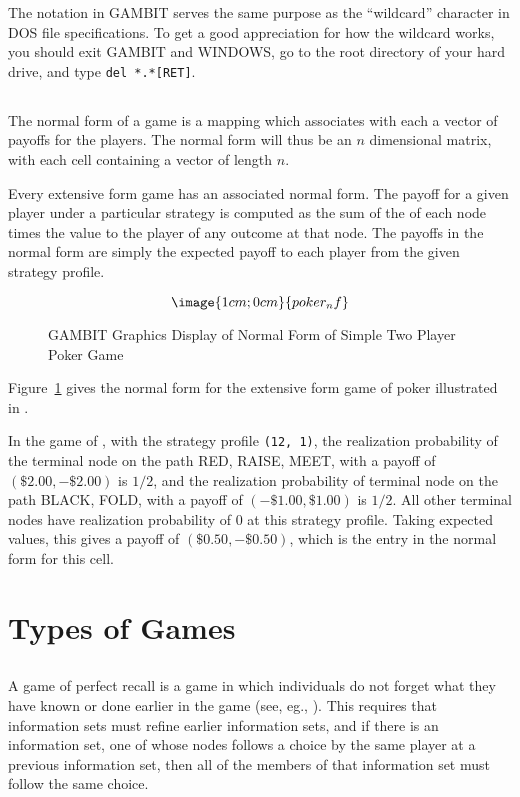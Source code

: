 The {\tt *} notation in GAMBIT serves the same purpose as the ``wildcard'' 
character in DOS file specifications.  To get a good appreciation for how 
the wildcard works, you should exit GAMBIT and WINDOWS, go to the root 
directory of your hard drive, and type \verb+del *.*[RET]+.

\subsection{}\label{normformsec}
The normal form of a game is a mapping which associates with 
each  a vector of
 payoffs for the players.  The normal form will thus be an $n$ dimensional 
matrix, with each cell containing a vector of length $n$.

Every extensive form game has an associated normal form.  The payoff for 
a given player under a particular strategy is computed as the sum of the 
 of each node times the 
value to the player of any outcome at that node.  The payoffs in the normal 
form are simply the expected payoff to each player from the given strategy
 profile.  

\begin{figure}
$$\image{1cm;0cm}{poker_nf}$$
\caption{GAMBIT Graphics Display of Normal Form of
		Simple Two Player Poker Game}\label{fig_samp2}
\end{figure}

Figure~\ref{fig_samp2} gives the normal form for the extensive form game 
of poker illustrated in 
. 

In the game of  , with the 
strategy profile {\tt (12, 1)}, the realization probability of the terminal 
node on the path RED, RAISE, MEET, with a payoff of $(\$2.00, -\$2.00)$ 
is $1/2$, and the realization probability of terminal node on the path 
BLACK, FOLD, with a payoff of  $(-\$1.00, \$1.00)$ is $1/2$.    All other 
terminal nodes have realization probability of $0$ at this strategy profile.  
Taking expected values, this gives a payoff of  
$(\$0.50, -\$0.50)$, which is the entry in the normal form for this cell.  

\section{Types of Games}
\subsection{}\label{perfrecallsec}
A game of perfect recall is a game in which individuals do not forget what
they have known or done earlier in the game (see, eg., \cite{Mye:91}).  
This requires that
information sets must refine earlier information sets, and if there is
an information set, one of whose nodes follows a choice by the same player
at a previous information set, then all of the members of that information
set must follow the same choice.

